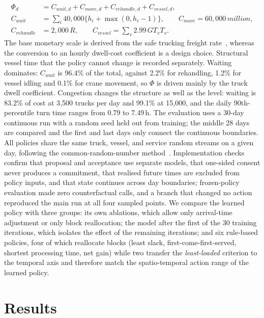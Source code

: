\documentclass[a4paper]{llncs}
\begin{document}
\begin{equation}
\begin{aligned}
\Phi_d&=C_{wait,d}+C_{move,d}+C_{rehandle,d}+C_{vessel,d},\\
C_{wait}&=\sum_i 40{,}000\{h_i+\max(0,h_i-1)\},\qquad
C_{move}=60{,}000\,million,\\
C_{rehandle}&=2{,}000\,R,\qquad
C_{vessel}=\sum_v 2.99\,GT_v T_v.
\end{aligned}
\end{equation}
The base monetary scale is
derived from the safe trucking freight rate~\cite{ref24}, whereas the
conversion to an hourly dwell-cost coefficient is a design choice.
Structural vessel time that the policy cannot change is recorded
separately. Waiting dominates: $C_{wait}$ is 96.4\% of the total, against 2.2\% for
rehandling, 1.2\% for vessel idling and 0.1\% for crane movement, so
$\Phi$ is driven mainly by the truck dwell coefficient. Congestion
changes the structure as well as the level: waiting is 83.2\% of cost at
3{,}500 trucks per day and 99.1\% at 15{,}000, and the daily
90th-percentile turn time ranges from 0.79 to 7.49\,h.
The evaluation uses a 30-day continuous run with a random seed held
out from training; the middle 28 days are
compared and the first and last days only connect the continuous
boundaries. All policies share the same truck, vessel, and service
random streams on a given day, following the common-random-number
method~\cite{ref22}. Implementation checks confirm that proposal and acceptance use separate
models, that one-sided consent never produces a commitment, that realised
future times are excluded from policy inputs, and that state continues
across day boundaries; frozen-policy evaluation made zero counterfactual calls, and
a branch that changed no action reproduced the main run at all four
sampled points. We compare the learned policy with three groups:
its own ablations, which allow only arrival-time adjustment or only
block reallocation; the model after the first of the 30 training
iterations, which isolates the effect of the remaining iterations; and
six rule-based policies, four of which reallocate blocks
(least slack, first-come-first-served, shortest processing time, net
gain) while two transfer the \emph{least-loaded} criterion to the
temporal axis and therefore match the spatio-temporal action range of
the learned policy.

\section{Results}
\label{sec:exp}
\end{document}
